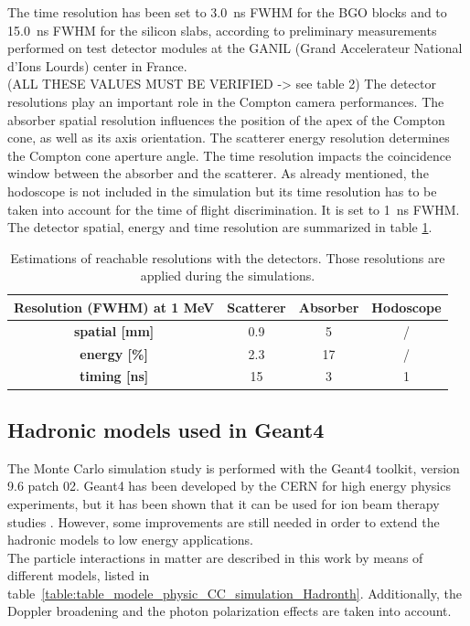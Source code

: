 The time resolution has been set to 3.0~ns FWHM for the BGO blocks and to 15.0~ns FWHM for the silicon slabs, according to preliminary measurements performed on test detector modules at the GANIL (Grand Accelerateur National d'Ions Lourds) center in France.\\ (ALL THESE VALUES MUST BE VERIFIED -> see table 2)
The detector resolutions play an important role in the Compton camera performances. The absorber spatial resolution influences the position of the apex of the Compton cone, as well as its axis orientation. The scatterer energy resolution determines the Compton cone aperture angle. The time resolution impacts the coincidence window between the absorber and the scatterer. As already mentioned, the hodoscope is not included in the simulation but its time resolution has to be taken into account for the time of flight discrimination. It is set to 1~ns FWHM.\\ 
The detector spatial, energy and time resolution are summarized in table \ref{table:table_resolution_detecteurs_CC_simulation_Hadronth}.

\begin{table} [!htbp]
\centering
\caption{Estimations of reachable resolutions with the detectors. Those resolutions are applied during the simulations.}
\begin{tabular}{cccc}
\hline
\textbf{Resolution (FWHM) at 1 MeV} & \textbf{Scatterer} & \textbf{Absorber} & \textbf{Hodoscope}\\
\hline 
\textbf{spatial [mm]	}			 &     0.9		 &  5 &	 /\\
\textbf{energy [\%]}				&	2.3			&  17	&	/\\
\textbf{timing [ns]}	        		&	15			&	3 	&  1\\
\hline
\end{tabular}
\label{table:table_resolution_detecteurs_CC_simulation_Hadronth}
\end{table}
       



\subsection{Hadronic models used in Geant4}

The Monte Carlo simulation study is performed with the Geant4 toolkit, version 9.6 patch 02. Geant4 has been developed by the CERN for high energy physics experiments, but it has been shown that it can be used for ion beam therapy studies \cite{cirrone_hadrontherapy_2011,toshito_new_2010}. However, some improvements are still needed in order to extend the hadronic models to low energy applications\cite{dedes_assessment_2014}.\\
The particle interactions in matter are described in this work by means of different models, listed in table~\ref{table:table_modele_physic_CC_simulation_Hadronth}. Additionally, the Doppler broadening and the photon polarization effects are taken into account.\\ 

